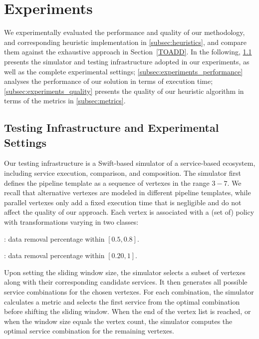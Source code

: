 \section{Experiments}\label{sec:experiment}
We experimentally evaluated the performance and quality of our methodology, and corresponding heuristic implementation in \cref{subsec:heuristics},
and compare them against the exhaustive approach in Section~\cref{TOADD}. In the following,
\cref{subsec:experiments_infrastructure} presents the simulator and testing infrastructure adopted in our experiments, as well as the complete experimental settings; \cref{subsec:experiments_performance} analyses the performance of our solution in terms of execution time; \cref{subsec:experiments_quality} presents the quality of our heuristic algorithm in terms of the metrics in \cref{subsec:metrics}.

\subsection{Testing Infrastructure and Experimental Settings}\label{subsec:experiments_infrastructure}
Our testing infrastructure is a Swift-based simulator of a service-based ecosystem, including service execution, comparison, and composition.
The simulator first defines the pipeline template as a sequence of vertexes in the range $3-7$.
We recall that alternative vertexes are modeled in different pipeline templates,
while parallel vertexes only add a fixed execution time that is negligible and do not affect the quality of our approach.
Each vertex is associated with a (set of) policy with transformations varying in two classes:
\begin{itemize*}
  \item \average: data removal percentage within $[0.5,0.8]$.
  \item \wide:    data removal percentage within $[0.20,1]$.
\end{itemize*}

Upon setting the sliding window size, the simulator selects a subset of vertexes along with their corresponding candidate services.
It then generates all possible service combinations for the chosen vertexes.
For each combination, the simulator calculates a metric and selects the first service from the optimal combination before shifting the sliding window.
When the end of the vertex list is reached, or when the window size equals the vertex count, the simulator computes the optimal service combination for the remaining vertexes.

